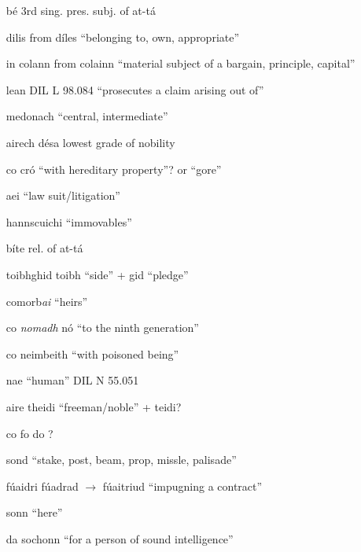 \documentclass[11pt]{article}
\begin{document}
\begin{enumerate}
  \item[b\'{e}] 3rd sing. pres. subj. of at-t\'{a}
  \item[dilis] from d\'{i}les \enquote{belonging to, own, appropriate}
  \item[in colann] from colainn \enquote{material subject of a bargain, principle, capital}
  \item[lean] DIL L 98.084 \enquote{prosecutes a claim arising out of}
  \item[medonach] \enquote{central, intermediate}
  \item[airech d\'{e}sa] lowest grade of nobility
  \item[co cr\'{o}] \enquote{with hereditary property}? or \enquote{gore}
  \item[aei] \enquote{law suit/litigation}
  \item[hannscuichi] \enquote{immovables}
  \item[b\'{i}te] rel. of at-t\'{a}
  \item[toibhghid] toibh \enquote{side} + gid \enquote{pledge}
  \item[comorb\emph{ai}] \enquote{heirs}
  \item[co \emph{nomadh} n\'{o}] \enquote{to the ninth generation}
  \item[co neimbeith] \enquote{with poisoned being}
  \item[nae] \enquote{human} DIL N 55.051
  \item[aire theidi] \enquote{freeman/noble} + teidi?
  \item[co fo do] ?
  \item[sond] \enquote{stake, post, beam, prop, missle, palisade}
  \item[f\'{u}aidri] f\'{u}adrad $\rightarrow$ f\'{u}aitriud \enquote{impugning a contract}
  \item[sonn] \enquote{here}
  \item[da sochonn] \enquote{for a person of sound intelligence} 
\end{enumerate}
\end{document}

